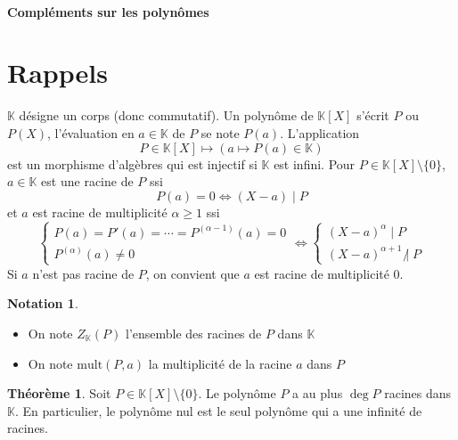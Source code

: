 \documentclass{article}
\theoremstyle{definition}
\newtheorem*{thm}{Théorème}
\newtheorem*{notation}{Notation}
\begin{document}
~

\vspace{1cm}
\thispagestyle{empty}

\begin{center}
\textbf{\LARGE Compléments sur les polynômes} \\[1em]
\end{center}
\tableofcontents
\thispagestyle{empty}

\newpage
\setcounter{page}{1}
\section{Rappels}

$\mathbb K$ désigne un corps (donc commutatif). Un polynôme de $\mathbb K[X]$ s'écrit $P$ ou $P(X)$, l'évaluation en $a\in\mathbb K$ de $P$ se note $P(a)$. L'application \[
    P\in\mathbb K[X] \longmapsto (a\longmapsto P(a)\in\mathbb K)
\]
est un morphisme d'algèbres qui est injectif si $\mathbb K$ est infini. Pour $P\in\mathbb K[X]\setminus \{0\}$, $a\in\mathbb K$ est une racine de $P$ ssi \[
    P(a)=0\iff (X-a)\;|\;P
\]
et $a$ est racine de multiplicité $\alpha \geq 1$ ssi \[
    \begin{cases}
        P(a)=P'(a)=\cdots=P^{(\alpha - 1)}(a)=0 \\
        P^{(\alpha)}(a)\neq 0
    \end{cases}
    \iff \begin{cases}
        (X-a)^\alpha \; |\; P\\
        (X-a)^{\alpha+1}\;\not|\;P
    \end{cases}
\]
Si $a$ n'est pas racine de $P$, on convient que $a$ est racine de multiplicité $0$.

\begin{notation} ~
    \begin{itemize}
        \item
            On note $Z_\mathbb K(P)$ l'ensemble des racines de $P$ dans $\mathbb K$
        \item On note $\mathrm{mult}(P, a)$ la multiplicité de la racine $a$ dans $P$
    \end{itemize}
\end{notation}

\begin{thm}
    Soit $P\in \mathbb K[X]\setminus \{0\}$. Le polynôme $P$ a au plus $\deg P$ racines dans $\mathbb K$.
    En particulier, le polynôme nul est le seul polynôme qui a une infinité de racines.
\end{thm}
\end{document}
